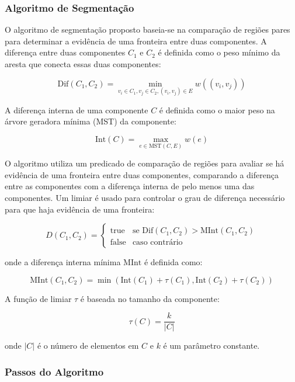 \documentclass[12pt]{article}
\begin{document}
\subsubsection{Algoritmo de Segmentação}

O algoritmo de segmentação proposto baseia-se na comparação de regiões pares para determinar a evidência de uma fronteira entre duas componentes. A diferença entre duas componentes \( C_1 \) e \( C_2 \) é definida como o peso mínimo da aresta que conecta essas duas componentes:

\[
\text{Dif}(C_1, C_2) = \min_{v_i \in C_1, v_j \in C_2, (v_i, v_j) \in E} w((v_i, v_j))
\]

A diferença interna de uma componente \( C \) é definida como o maior peso na árvore geradora mínima (MST) da componente:

\[
\text{Int}(C) = \max_{e \in \text{MST}(C, E)} w(e)
\]

O algoritmo utiliza um predicado de comparação de regiões para avaliar se há evidência de uma fronteira entre duas componentes, comparando a diferença entre as componentes com a diferença interna de pelo menos uma das componentes. Um limiar é usado para controlar o grau de diferença necessário para que haja evidência de uma fronteira:

\[
D(C_1, C_2) = \begin{cases} 
\text{true} & \text{se } \text{Dif}(C_1, C_2) > \text{MInt}(C_1, C_2) \\
\text{false} & \text{caso contrário}
\end{cases}
\]

onde a diferença interna mínima \( \text{MInt} \) é definida como:

\[
\text{MInt}(C_1, C_2) = \min(\text{Int}(C_1) + \tau(C_1), \text{Int}(C_2) + \tau(C_2))
\]

A função de limiar \( \tau \) é baseada no tamanho da componente:

\[
\tau(C) = \frac{k}{|C|}
\]

onde \( |C| \) é o número de elementos em \( C \) e \( k \) é um parâmetro constante.

\subsubsection{Passos do Algoritmo}
\end{document}
